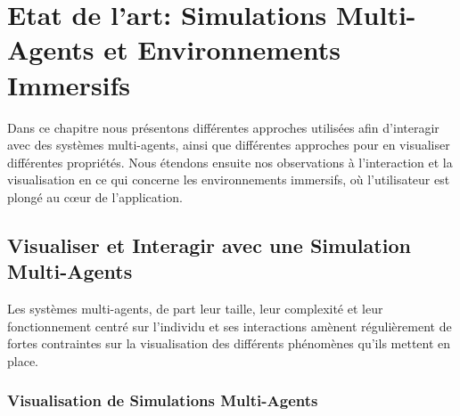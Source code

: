 \chapter{Etat de l'art: Simulations Multi-Agents et Environnements Immersifs}
\label{ChapitreEAVR}

	Dans ce chapitre nous présentons différentes approches utilisées afin d'interagir avec des systèmes multi-agents, ainsi que différentes approches pour en visualiser différentes propriétés. Nous étendons ensuite nos observations à l'interaction et la visualisation en ce qui concerne les environnements immersifs, où l'utilisateur est plongé au cœur de l'application.
	

	\section{Visualiser et Interagir avec une Simulation Multi-Agents}
		
	Les systèmes multi-agents, de part leur taille, leur complexité et leur fonctionnement centré sur l'individu et ses interactions amènent régulièrement de fortes contraintes sur la visualisation des différents phénomènes qu'ils mettent en place.		
		
		\subsection{Visualisation de Simulations Multi-Agents}
		
